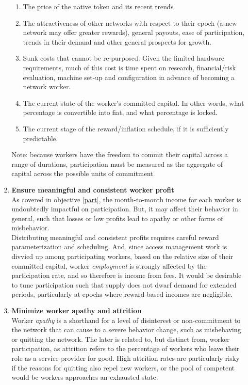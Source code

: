 \documentclass[11pt]{amsart}
\begin{document}
\begin{enumerate}
\begin{enumerate}
   \item The price of the native token and its recent trends
   \item The attractiveness of other networks with respect to their epoch (a new network may offer greater rewards), general payouts, ease of participation, trends in their demand and other general prospects for growth. 
   \item Sunk costs that cannot be re-purposed. Given the limited hardware requirements, much of this cost is time spent on research, financial/risk evaluation, machine set-up and configuration in advance of becoming a network worker. 
   \item The current state of the worker's committed capital. In other words, what percentage is convertible into fiat, and what percentage is locked.
   \item The current stage of the reward/inflation schedule, if it is sufficiently predictable. 
   \end{enumerate}
   Note: because workers have the freedom to commit their capital across a range of durations, participation must be measured as the aggregate of capital across the possible units of commitment.
   \\
   \item \textbf{Ensure meaningful and consistent worker profit}\label{profit}
   \\
   As covered in objective \ref{part}, the month-to-month income for each worker is undoubtedly impactful on participation. But, it may affect their behavior in general, such that losses or low profits lead to apathy or other forms of misbehavior.
   \\
   Distributing meaningful and consistent profits requires careful reward parameterization and scheduling. And, since access management work is divvied up among participating workers, based on the relative size of their committed capital, worker \textit{employment} is strongly affected by the participation rate, and so therefore is income from fees. It would be desirable to tune participation such that supply does not dwarf demand for extended periods, particularly at epochs where reward-based incomes are negligible.
   \\
   \item \textbf{Minimize worker apathy and attrition}\label{attrition}
   \\
   Worker \textit{apathy} is a shorthand for a level of disinterest or non-commitment to the network that can cause to a severe behavior change, such as misbehaving or quitting the network. The later is related to, but distinct from, worker participation, as attrition refers to the percentage of workers who leave their role as a service-provider for good. High attrition rates are particularly risky if the reasons for quitting also repel new workers, or the pool of competent would-be workers approaches an exhausted state.   

\end{enumerate}
\end{document}
